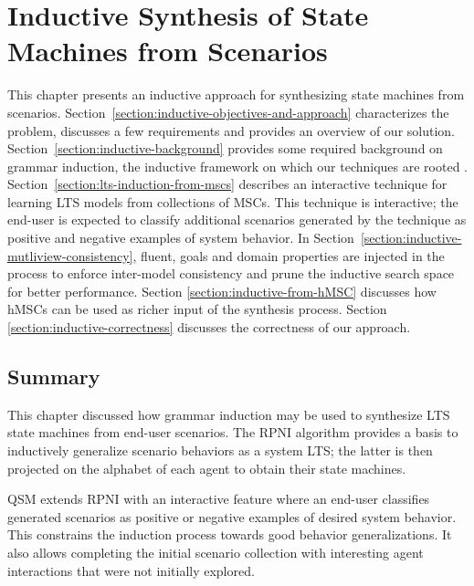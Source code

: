 \chapter{Inductive Synthesis of State Machines from Scenarios\label{chapter:inductive-synthesis}}

This chapter presents an inductive approach for synthesizing state machines from scenarios. Section~\ref{section:inductive-objectives-and-approach} characterizes the problem, discusses a few requirements and provides an overview of our solution. Section~\ref{section:inductive-background} provides some required background on grammar induction, the inductive framework on which our techniques are rooted \cite{Gold:1978}. Section~\ref{section:lts-induction-from-mscs} describes an interactive technique for learning LTS models from collections of MSCs. This technique is interactive; the end-user is expected to classify additional scenarios generated by the technique as positive and negative examples of system behavior. In Section~\ref{section:inductive-mutliview-consistency}, fluent, goals and domain properties are injected in the process to enforce inter-model consistency and prune the inductive search space for better performance. Section \ref{section:inductive-from-hMSC} discusses how hMSCs can be used as richer input of the synthesis process. Section \ref{section:inductive-correctness} discusses the correctness of our approach.









\section*{Summary}

This chapter discussed how grammar induction may be used to synthesize LTS state machines from end-user scenarios. The RPNI algorithm provides a basis to inductively generalize scenario behaviors as a system LTS; the latter is then projected on the alphabet of each agent to obtain their state machines.

QSM extends RPNI with an interactive feature where an end-user classifies generated scenarios as positive or negative examples of desired system behavior. This constrains the induction process towards good behavior generalizations. It also allows completing the initial scenario collection with interesting agent interactions that were not initially explored.

